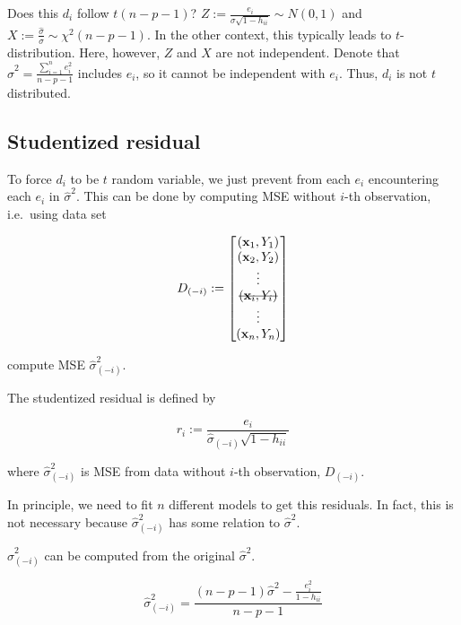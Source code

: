 \documentclass[]{book}
\newcommand{\msout}[1]{\text{\sout{\ensuremath{#1}}}}
\theoremstyle{definition}
\theoremstyle{definition}
\theoremstyle{definition}
\theoremstyle{remark}
\let\BeginKnitrBlock\begin \let\EndKnitrBlock\end
\begin{document}
Does this \(d_i\) follow \(t(n - p - 1)\)? \(Z := \frac{e_i}{\sigma \sqrt{1 - h_{ii}}} \sim N(0, 1)\) and \(X := \frac{\hat\sigma}{\sigma} \sim \chi^2(n - p - 1)\). In the other context, this typically leads to \(t\)-distribution. Here, however, \(Z\) and \(X\) are not independent. Denote that \(\hat\sigma^2 = \frac{\sum\limits_{i = 1}^n e_i^2}{n - p - 1}\) includes \(e_i\), so it cannot be independent with \(e_i\). Thus, \(d_i\) is not \(t\) distributed.

\hypertarget{studentized-residual}{%
\subsection{Studentized residual}\label{studentized-residual}}

To force \(d_i\) to be \(t\) random variable, we just prevent from each \(e_i\) encountering each \(e_i\) in \(\hat\sigma^2\). This can be done by computing MSE without \(i\)-th observation, i.e.~using data set

\[
D_{(-i)} := \begin{bmatrix}
  (\mathbf{x}_1, Y_1) \\
  (\mathbf{x}_2, Y_2) \\
  \vdots \\
  \msout{(\mathbf{x}_i, Y_i)} \\
  \vdots \\
  (\mathbf{x}_n, Y_n)
\end{bmatrix}
\]

compute MSE \(\hat\sigma_{(-i)}^2\).

\BeginKnitrBlock{definition}[Studentized residual]
\protect\hypertarget{def:studresid}{}{\label{def:studresid} {} }The studentized residual is defined by

\[r_i := \frac{e_i}{\hat\sigma_{(-i)} \sqrt{1 - h_{ii}}}\]

where \(\hat\sigma_{(-i)}^2\) is MSE from data without \(i\)-th observation, \(D_{(-i)}\).
\EndKnitrBlock{definition}

In principle, we need to fit \(n\) different models to get this residuals. In fact, this is not necessary because \(\hat\sigma_{(-i)}^2\) has some relation to \(\hat\sigma^2\).

\BeginKnitrBlock{lemma}
\protect\hypertarget{lem:studsig}{}{\label{lem:studsig} }\(\hat\sigma_{(-i)}^2\) can be computed from the original \(\hat\sigma^2\).

\[\hat\sigma_{(-i)}^2 = \frac{(n - p - 1)\hat\sigma^2 - \frac{e_i^2}{1 - h_{ii}}}{n - p - 1}\]
\EndKnitrBlock{lemma}
\end{document}
